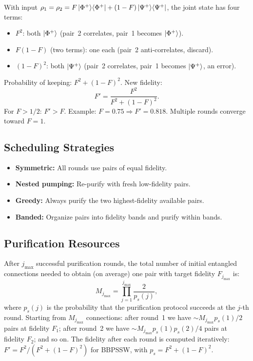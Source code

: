 \documentclass[10pt,a4paper]{article}
\begin{document}
With input $\rho_1=\rho_2=F\ket{\Phi^+}\!\bra{\Phi^+}+(1-F)\ket{\Psi^+}\!\bra{\Psi^+}$, the joint state has four terms:
\begin{itemize}[nosep]
\item $F^2$: both $\ket{\Phi^+}$ (pair~2 correlates, pair~1 becomes $\ket{\Phi^+}$).
\item $F(1-F)$ (two terms): one each (pair~2 anti-correlates, discard).
\item $(1-F)^2$: both $\ket{\Psi^+}$ (pair~2 correlates, pair~1 becomes $\ket{\Psi^+}$, an error).
\end{itemize}
Probability of keeping: $F^2+(1-F)^2$. New fidelity:
\[
F'=\frac{F^2}{F^2+(1-F)^2}.
\]
For $F>1/2$: $F'>F$. Example: $F=0.75\Rightarrow F'=0.818$. Multiple rounds converge toward $F=1$.

\subsection{Scheduling Strategies}

\begin{tcolorbox}[propstyle, title={Properties}]
\begin{itemize}[nosep]
\item \textbf{Symmetric:} All rounds use pairs of equal fidelity.
\item \textbf{Nested pumping:} Re-purify with fresh low-fidelity pairs.
\item \textbf{Greedy:} Always purify the two highest-fidelity available pairs.
\item \textbf{Banded:} Organize pairs into fidelity bands and purify within bands.
\end{itemize}
\end{tcolorbox}

\subsection{Purification Resources}

After $j_{\max}$ successful purification rounds, the total number of initial entangled connections needed to obtain (on average) one pair with target fidelity $F_{j_{\max}}$ is:
\[
M_{j_{\max}}=\prod_{j=1}^{j_{\max}}\frac{2}{p_s(j)},
\]
where $p_s(j)$ is the probability that the purification protocol succeeds at the $j$-th round. Starting from $M_{j_{\max}}$ connections: after round~1 we have $\sim M_{j_{\max}}p_s(1)/2$ pairs at fidelity $F_1$; after round~2 we have $\sim M_{j_{\max}}p_s(1)p_s(2)/4$ pairs at fidelity $F_2$; and so on. The fidelity after each round is computed iteratively: $F'=F^2/(F^2+(1-F)^2)$ for BBPSSW, with $p_s=F^2+(1-F)^2$.
\end{document}
